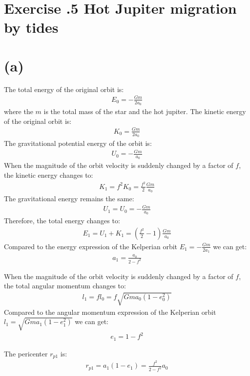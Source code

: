 \documentclass[a4paper,12pt]{article}
\begin{document}
\section*{\textbf{Exercise \uppercase\expandafter{}.5 Hot Jupiter migration by tides}}
\section*{(a)}
The total energy of the original orbit is:
\begin{align*}
    E_0 = -\frac{Gm}{2a_0}
\end{align*}
where the $m$ is the total mass of the star and the hot jupiter.
The kinetic energy of the original orbit is:
\begin{align*}
    K_0 = \frac{Gm}{2a_0}
\end{align*}
The gravitational potential energy of the orbit is:
\begin{align*}
    U_0 = - \frac{Gm}{a_0}
\end{align*}
When the magnitude of the orbit velocity is suddenly changed by a factor of $f$, the kinetic energy changes to:
\begin{align*}
    K_1 = f^2 K_0 = \frac{f^2}{2} \frac{Gm}{a_0}
\end{align*}
The gravitational energy remains the same:
\begin{align*}
    U_1 = U_0 = - \frac{Gm}{a_0}
\end{align*}
Therefore, the total energy changes to:
\begin{align*}
    E_1 = U_1 + K_1 = (\frac{f^2}{2} - 1) \frac{Gm}{a_0}
\end{align*}
Compared to the energy expression of the Kelperian orbit $E_1 = - \frac{Gm}{2a_1}$ we can get:
\begin{align*}
    a_1 = \frac{a_0}{2 - f^2}
\end{align*}

When the magnitude of the orbit velocity is suddenly changed by a factor of $f$, the total angular momentum changes to:
\begin{align*}
    l_1 = fl_0 = f\sqrt{Gma_0(1-e_0^2)}
\end{align*}
Compared to the angular momentum expression of the Kelperian orbit $l_1 = \sqrt{Gma_1(1-e_1^2)}$ we can get:
\begin{align*}
    e_1 = 1 - f^2
\end{align*}

The pericenter $r_{p1}$ is:
\begin{align*}
    r_{p1} = a_1 (1 - e_1) = \frac{f^2}{2 - f^2} a_0
\end{align*}
\end{document}
